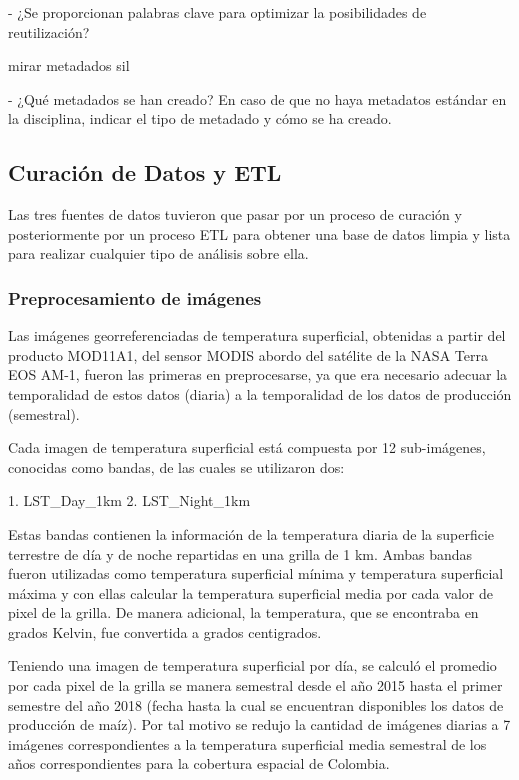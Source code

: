 \documentclass[12pt, spanish]{article}
\begin{document}
- ¿Se proporcionan palabras clave para optimizar la posibilidades de reutilización?

mirar metadados sil

- ¿Qué metadados se han creado? En caso de que no haya metadatos estándar en la disciplina, indicar el tipo de metadado y cómo se ha creado.

\subsection{Curación de Datos y ETL}

Las tres fuentes de datos tuvieron que pasar por un proceso de curación y posteriormente por un proceso ETL para obtener una base de datos limpia y lista para realizar cualquier tipo de análisis sobre ella.

\subsubsection{Preprocesamiento de imágenes}

Las imágenes georreferenciadas de temperatura superficial, obtenidas a partir del producto MOD11A1, del sensor MODIS abordo del satélite de la NASA Terra EOS AM-1, fueron las primeras en preprocesarse, ya que era necesario adecuar la temporalidad de estos datos (diaria) a la temporalidad de los datos de producción (semestral).

Cada imagen de temperatura superficial está compuesta por 12 sub-imágenes, conocidas como bandas, de las cuales se utilizaron dos:

1. LST_Day_1km
2. LST_Night_1km

Estas bandas contienen la información de la temperatura diaria de la superficie terrestre de día y de noche repartidas en una grilla de 1 km. Ambas bandas fueron utilizadas como temperatura superficial mínima y temperatura superficial máxima y con ellas calcular la temperatura superficial media por cada valor de pixel de la grilla. De manera adicional, la temperatura, que se encontraba en grados Kelvin, fue convertida a grados centigrados.

Teniendo una imagen de temperatura superficial por día, se calculó el promedio por cada pixel de la grilla se manera semestral desde el año 2015 hasta el primer semestre del año 2018 (fecha hasta la cual se encuentran disponibles los datos de producción de maíz). Por tal motivo se redujo la cantidad de imágenes diarias a 7 imágenes correspondientes a la temperatura superficial media semestral de los años correspondientes para la cobertura espacial de Colombia.
\end{document}
